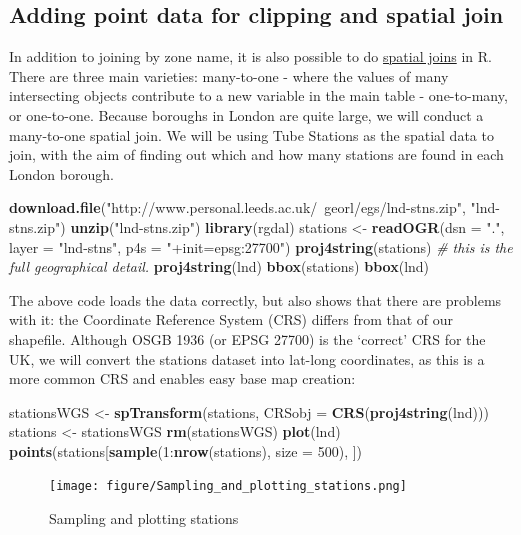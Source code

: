 \documentclass[]{article}
\newenvironment{Shaded}{}{}
\newcommand{\KeywordTok}[1]{\textcolor[rgb]{0.00,0.44,0.13}{\textbf{{#1}}}}
\newcommand{\DataTypeTok}[1]{\textcolor[rgb]{0.56,0.13,0.00}{{#1}}}
\newcommand{\DecValTok}[1]{\textcolor[rgb]{0.25,0.63,0.44}{{#1}}}
\newcommand{\StringTok}[1]{\textcolor[rgb]{0.25,0.44,0.63}{{#1}}}
\newcommand{\CommentTok}[1]{\textcolor[rgb]{0.38,0.63,0.69}{\textit{{#1}}}}
\newcommand{\NormalTok}[1]{{#1}}
\begin{document}
\subsection{Adding point data for clipping and spatial join}

In addition to joining by zone name, it is also possible to do
\href{http://help.arcgis.com/en/arcgisdesktop/10.0/help/index.html\#//00080000000q000000}{spatial
joins} in R. There are three main varieties: many-to-one - where the
values of many intersecting objects contribute to a new variable in the
main table - one-to-many, or one-to-one. Because boroughs in London are
quite large, we will conduct a many-to-one spatial join. We will be
using Tube Stations as the spatial data to join, with the aim of finding
out which and how many stations are found in each London borough.

\begin{Shaded}
\begin{Highlighting}[]
\KeywordTok{download.file}\NormalTok{(}\StringTok{"http://www.personal.leeds.ac.uk/~georl/egs/lnd-stns.zip"}\NormalTok{, }\StringTok{"lnd-stns.zip"}\NormalTok{)}
\KeywordTok{unzip}\NormalTok{(}\StringTok{"lnd-stns.zip"}\NormalTok{)}
\KeywordTok{library}\NormalTok{(rgdal)}
\NormalTok{stations <- }\KeywordTok{readOGR}\NormalTok{(}\DataTypeTok{dsn =} \StringTok{"."}\NormalTok{, }\DataTypeTok{layer =} \StringTok{"lnd-stns"}\NormalTok{, }\DataTypeTok{p4s =} \StringTok{"+init=epsg:27700"}\NormalTok{)}
\KeywordTok{proj4string}\NormalTok{(stations)  }\CommentTok{# this is the full geographical detail.}
\KeywordTok{proj4string}\NormalTok{(lnd)}
\KeywordTok{bbox}\NormalTok{(stations)}
\KeywordTok{bbox}\NormalTok{(lnd)}
\end{Highlighting}
\end{Shaded}
The above code loads the data correctly, but also shows that there are
problems with it: the Coordinate Reference System (CRS) differs from
that of our shapefile. Although OSGB 1936 (or EPSG 27700) is the
`correct' CRS for the UK, we will convert the stations dataset into
lat-long coordinates, as this is a more common CRS and enables easy base
map creation:

\begin{Shaded}
\begin{Highlighting}[]
\NormalTok{stationsWGS <- }\KeywordTok{spTransform}\NormalTok{(stations, }\DataTypeTok{CRSobj =} \KeywordTok{CRS}\NormalTok{(}\KeywordTok{proj4string}\NormalTok{(lnd)))}
\NormalTok{stations <- stationsWGS}
\KeywordTok{rm}\NormalTok{(stationsWGS)}
\KeywordTok{plot}\NormalTok{(lnd)}
\KeywordTok{points}\NormalTok{(stations[}\KeywordTok{sample}\NormalTok{(}\DecValTok{1}\NormalTok{:}\KeywordTok{nrow}\NormalTok{(stations), }\DataTypeTok{size =} \DecValTok{500}\NormalTok{), ])}
\end{Highlighting}
\end{Shaded}
\begin{figure}[htbp]
\centering
\texttt{[image: figure/Sampling\_and\_plotting\_stations.png]}
\caption{Sampling and plotting stations}
\end{figure}
\end{document}
